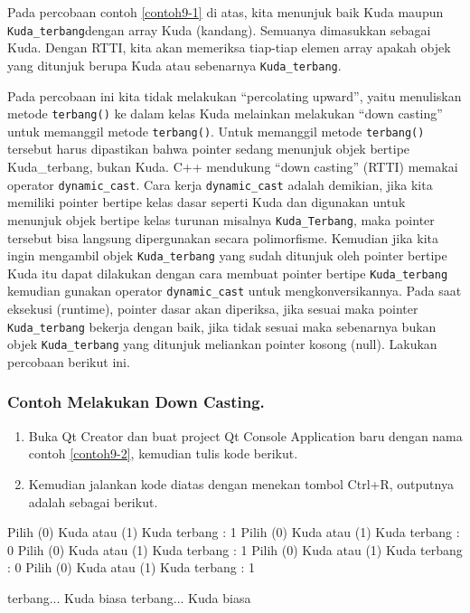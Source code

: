 Pada percobaan contoh \ref{contoh9-1} di atas, kita menunjuk baik Kuda maupun
\texttt{Kuda\_terbang}dengan array Kuda (kandang). Semuanya dimasukkan
sebagai Kuda. Dengan RTTI, kita akan memeriksa tiap-tiap elemen array
apakah objek yang ditunjuk berupa Kuda atau sebenarnya
\texttt{Kuda\_terbang}.

Pada percobaan ini kita tidak melakukan ``percolating upward'', yaitu
menuliskan metode \texttt{terbang()} ke dalam kelas Kuda melainkan
melakukan ``down casting'' untuk memanggil metode \texttt{terbang()}.
Untuk memanggil metode \texttt{terbang()} tersebut harus dipastikan
bahwa pointer sedang menunjuk objek bertipe Kuda\_terbang, bukan Kuda.
C++ mendukung ``down casting'' (RTTI) memakai operator
\texttt{dynamic\_cast}. Cara kerja \texttt{dynamic\_cast} adalah
demikian, jika kita memiliki pointer bertipe kelas dasar seperti Kuda
dan digunakan untuk menunjuk objek bertipe kelas turunan misalnya
\texttt{Kuda\_Terbang}, maka pointer tersebut bisa langsung dipergunakan
secara polimorfisme. Kemudian jika kita ingin mengambil objek
\texttt{Kuda\_terbang} yang sudah ditunjuk oleh pointer bertipe Kuda itu
dapat dilakukan dengan cara membuat pointer bertipe
\texttt{Kuda\_terbang} kemudian gunakan operator \texttt{dynamic\_cast}
untuk mengkonversikannya. Pada saat eksekusi (runtime), pointer dasar
akan diperiksa, jika sesuai maka pointer \texttt{Kuda\_terbang} bekerja
dengan baik, jika tidak sesuai maka sebenarnya bukan objek
\texttt{Kuda\_terbang} yang ditunjuk meliankan pointer kosong (null).
Lakukan percobaan berikut ini.

\subsubsection*{Contoh Melakukan Down Casting.}

\begin{enumerate}

\item
 Buka Qt Creator dan buat project Qt Console Application baru dengan
 nama contoh \ref{contoh9-2}, kemudian tulis kode berikut.




\item
 Kemudian jalankan kode diatas dengan menekan tombol Ctrl+R, outputnya
 adalah sebagai berikut.
\end{enumerate}

\begin{lcverbatim}
Pilih (0) Kuda atau (1) Kuda terbang : 1
Pilih (0) Kuda atau (1) Kuda terbang : 0
Pilih (0) Kuda atau (1) Kuda terbang : 1
Pilih (0) Kuda atau (1) Kuda terbang : 0
Pilih (0) Kuda atau (1) Kuda terbang : 1

terbang...
Kuda biasa
terbang...
Kuda biasa
\end{lcverbatim}

